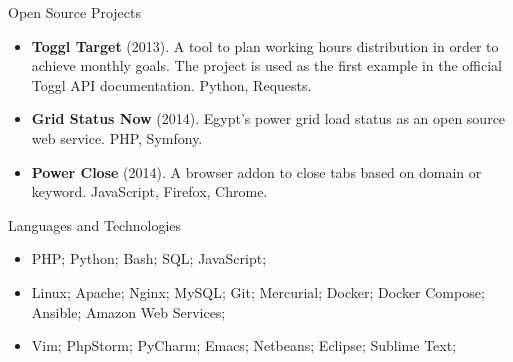 \documentclass[]{mcdowellcv}
\begin{document}
	\begin{cvsection}{Open Source Projects}
		\begin{cvsubsection}{}{}{}
			\begin{itemize}
				\item \textbf{Toggl Target} (2013). A tool to plan working hours distribution in order to achieve monthly goals. The project is used as the first example in the official Toggl API documentation. Python, Requests.
			
				\item \textbf{Grid Status Now} (2014). Egypt's power grid load status as an open source web service. PHP, Symfony.
				
				\item \textbf{Power Close} (2014). A browser addon to close tabs based on domain or keyword. JavaScript, Firefox, Chrome.
			\end{itemize}
		\end{cvsubsection}
	\end{cvsection}


	\begin{cvsection}{Languages and Technologies}
		\begin{cvsubsection}{}{}{}	
			\begin{itemize}
				\item PHP; Python; Bash; SQL; JavaScript;
				\item Linux; Apache; Nginx; MySQL; Git; Mercurial; Docker; Docker Compose; Ansible; Amazon Web Services;
				\item Vim; PhpStorm; PyCharm; Emacs; Netbeans; Eclipse; Sublime Text;
			\end{itemize}
		\end{cvsubsection}
	\end{cvsection}
	
\end{document}
